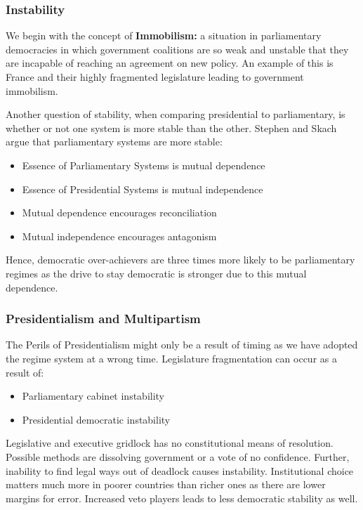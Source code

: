 \documentclass[12pt, letterpaper]{article}
\begin{document}
\subsubsection{Instability}
We begin with the concept of \textbf{Immobilism:} a situation in parliamentary democracies in which government coalitions are so weak and unstable that they are incapable of reaching an agreement on new policy. An example of this is France and their highly fragmented legislature leading to government immobilism.

Another question of stability, when comparing presidential to parliamentary, is whether or not one system is more stable than the other. Stephen and Skach argue that parliamentary systems are more stable:
\begin{itemize}
	\item Essence of Parliamentary Systems is mutual dependence
	\item Essence of Presidential Systems is mutual independence
	\item Mutual dependence encourages reconciliation
	\item Mutual independence encourages antagonism
\end{itemize}
Hence, democratic over-achievers are three times more likely to be parliamentary regimes as the drive to stay democratic is stronger due to this mutual dependence.

\subsubsection{Presidentialism and Multipartism}
The Perils of Presidentialism might only be a result of timing as we have adopted the regime system at a wrong time. Legislature fragmentation can occur as a result of:
\begin{itemize}
	\item Parliamentary cabinet instability
	\item Presidential democratic instability
\end{itemize}
Legislative and executive gridlock has no constitutional means of resolution. Possible methods are dissolving government or a vote of no confidence.
Further, inability to find legal ways out of deadlock causes instability. Institutional choice matters much more in poorer countries than richer ones as there are lower margins for error.
Increased veto players leads to less democratic stability as well.
\end{document}
